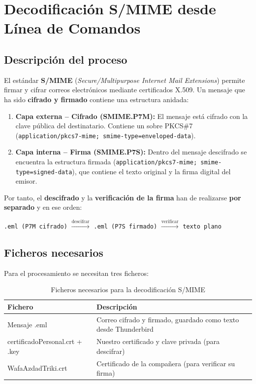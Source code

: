 \chapter{Decodificación S/MIME desde Línea de Comandos}

\section{Descripción del proceso}

El estándar \textbf{S/MIME} (\textit{Secure/Multipurpose Internet Mail Extensions}) permite firmar y cifrar correos electrónicos mediante certificados X.509. Un mensaje que ha sido \textbf{cifrado y firmado} contiene una estructura anidada:

\begin{enumerate}
    \item \textbf{Capa externa -- Cifrado (SMIME.P7M):} El mensaje está cifrado con la clave pública del destinatario. Contiene un sobre PKCS\#7 (\texttt{application/pkcs7-mime; smime-type=enveloped-data}).
    \item \textbf{Capa interna -- Firma (SMIME.P7S):} Dentro del mensaje descifrado se encuentra la estructura firmada (\texttt{application/pkcs7-mime; smime-type=signed-data}), que contiene el texto original y la firma digital del emisor.
\end{enumerate}

Por tanto, el \textbf{descifrado} y la \textbf{verificación de la firma} han de realizarse \textbf{por separado} y en ese orden:

\begin{center}
    \texttt{.eml (P7M cifrado)} $\xrightarrow{\text{descifrar}}$ \texttt{.eml (P7S firmado)} $\xrightarrow{\text{verificar}}$ \texttt{texto plano}
\end{center}

\section{Ficheros necesarios}

Para el procesamiento se necesitan tres ficheros:

\begin{table}[H]
    \centering
    \caption{Ficheros necesarios para la decodificación S/MIME}
    \begin{tabularx}{\textwidth}{l|X}
        \toprule
        \textbf{Fichero} & \textbf{Descripción} \\
        \midrule
        Mensaje .eml & Correo cifrado y firmado, guardado como texto desde Thunderbird \\
        certificadoPersonal.crt + .key & Nuestro certificado y clave privada (para descifrar) \\
        WafaAzdadTriki.crt & Certificado de la compañera (para verificar su firma) \\
        \bottomrule
    \end{tabularx}
\end{table}

